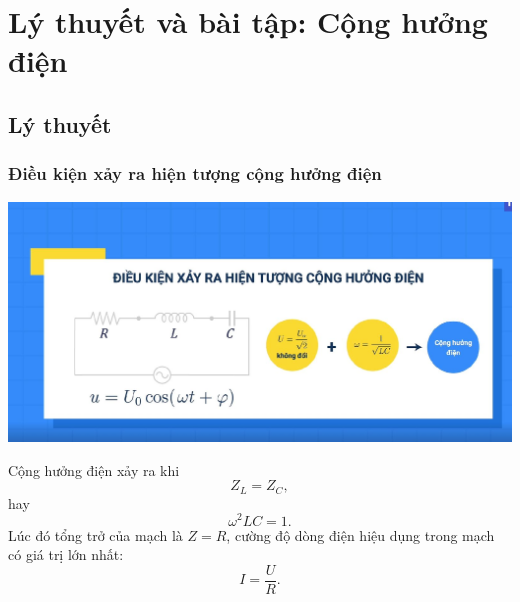 
\chapter[Lý thuyết và bài tập: Cộng hưởng điện]{Lý thuyết và bài tập: Cộng hưởng điện}
\section{Lý thuyết}
\subsection{Điều kiện xảy ra hiện tượng cộng hưởng điện}

\begin{center}
	\includegraphics[scale=0.3]{../figs/VN12-PH-19-L-012-1-V2-2.jpg}
\end{center}

Cộng hưởng điện xảy ra khi
\begin{equation*}
	Z_L = Z_C,
\end{equation*}
hay
\begin{equation*}
	\omega ^2 LC =1.
\end{equation*}
Lúc đó tổng trở của mạch là $Z=R$, cường độ dòng điện hiệu dụng trong mạch có giá trị lớn nhất:
\begin{equation*}
	I=\dfrac{U}{R}.
\end{equation*}

